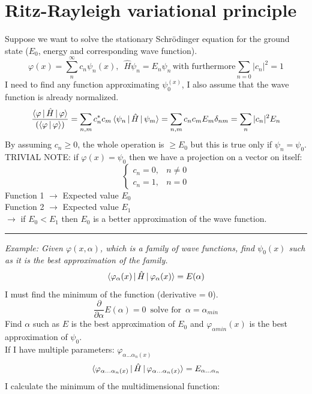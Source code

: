 \section{Ritz-Rayleigh variational principle}
Suppose we want to solve the stationary Schr\"{o}dinger equation for the ground state ($E_0$, energy and corresponding wave function).\\
\[
\varphi(x)=\sum_{n}^{\infty}c_n\psi_n(x),\,\,\, \hat{H}\psi_n=E_n\psi_n\, \text{with furthermore} \sum_{n=0}|c_n|^2=1
\]
I need to find any function approximating $\psi_0^{(x)}$, I also assume that the wave function is already normalized.
\[
\frac{\braket{\varphi\,|\,\hat{H}\,|\,\varphi}}{(\braket{\varphi \,|\, \varphi})}=
\sum_{n,m}c_n^*c_m\braket{\psi_n\,|\,\hat{H}\,|\,\psi_m}=\sum_{n,m}c_nc_mE_m\delta_{nm}=
\sum_{n}|c_n|^2E_n
\]
By assuming $c_n \geq 0$, the whole operation is $\geq E_0$ but this is true only if $\psi_n=\psi_0$.\\
\newline
TRIVIAL NOTE: if $\varphi(x)=\psi_0$ then we have a projection on a vector on itself:
\[
\begin{cases}
c_n=0, & n \neq 0\\
c_n=1, & n=0
\end{cases}
\]
\newline
Function 1 $\rightarrow$ Expected value $E_0$\\
Function 2 $\rightarrow$ Expected value $E_1$\\
$\rightarrow$ if $E_0 < E_1$ then $E_0$ is a better approximation of the wave function.\\
\newline
\noindent\rule{4cm}{0.1pt}
\newline
\textit{Example: Given $\varphi(x, \alpha)$, which is a family of wave functions, find $\psi_0(x)$ such as it is the best approximation of the family. }\\
\[
\braket{\varphi_{\alpha}(x)\,|\,\hat{H}\,|\,\varphi_{\alpha}(x)}=E(\alpha)
\]
I must find the minimum of the function (derivative = 0).
\[
\frac{\partial}{\partial\alpha}E(\alpha)=0\, \text{  solve for  }\, \alpha=\alpha_{min}
\]
Find $\alpha$ such as $E$ is the best approximation of $E_0$ and $\varphi_{\alpha min}(x)$ is the best approximation of $\psi_0$.\\
If I have multiple parameters: $\varphi_{\alpha \dots \alpha_n(x)}$
\[
\braket{\varphi_{\alpha \dots \alpha_n(x)}\,|\,\hat{H}\,|\,\varphi_{\alpha \dots \alpha_n(x)}} = E_{\alpha \dots \alpha_n}
\]
I calculate the minimum of the multidimensional function:
